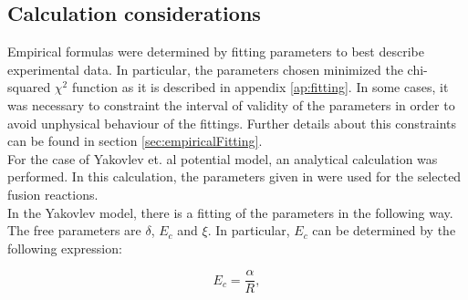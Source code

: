 \documentclass[openany]{book}
\begin{document}
 
 
 
\subsection{Calculation considerations} \label{sub:considerationsNonResonant}

Empirical formulas were determined by fitting parameters to best describe experimental data. In particular, the parameters chosen minimized the chi-squared $\chi^2$ function as it is described in appendix \ref{ap:fitting}. In some cases, it was necessary to constraint the interval of validity of the parameters in order to avoid unphysical behaviour of the fittings. Further details about this constraints can be found in section \ref{sec:empiricalFitting}. \\

For the case of Yakovlev et. al potential model, an analytical calculation was performed. In this calculation, the parameters given in \cite{yakovlev_beard_gasques_wiescher_2010} were used for the selected fusion reactions.  \\

In the Yakovlev model, there is a fitting of the parameters in the following way.  The free parameters are $\delta$, $E_c$ and $\xi$. In particular, $E_c$ can be determined by the following expression:

\begin{equation} \label{eq:potential_Yakovlev_Ec}
	E_c = \frac{\alpha}{R},
\end{equation}
\end{document}
